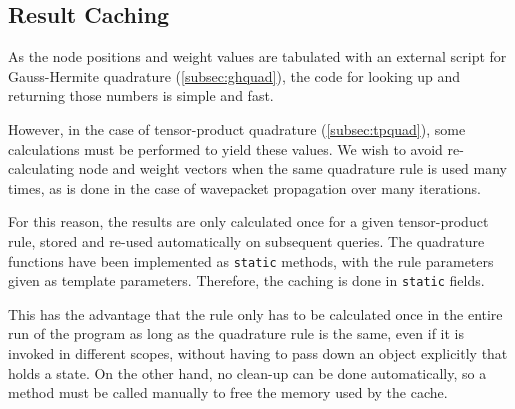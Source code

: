 \subsection{Result Caching}

As the node positions and weight values are tabulated with an external script
for Gauss-Hermite quadrature (\ref{subsec:ghquad}), the code for looking up and
returning those numbers is simple and fast.

However, in the case of tensor-product quadrature (\ref{subsec:tpquad}), some
calculations must be performed to yield these values.
We wish to avoid re-calculating node and weight vectors when the same quadrature
rule is used many times, as is done in the case of wavepacket propagation over
many iterations.

For this reason, the results are only calculated once for a given tensor-product
rule, stored and re-used automatically on subsequent queries.
The quadrature functions have been implemented as \texttt{static} methods, with
the rule parameters given as template parameters.
Therefore, the caching is done in \texttt{static} fields.

This has the advantage that the rule only has to be calculated once in the
entire run of the program as long as the quadrature rule is the same, even if it
is invoked in different scopes, without having to pass down an object explicitly
that holds a state.
On the other hand, no clean-up can be done automatically, so a method must be
called manually to free the memory used by the cache.
